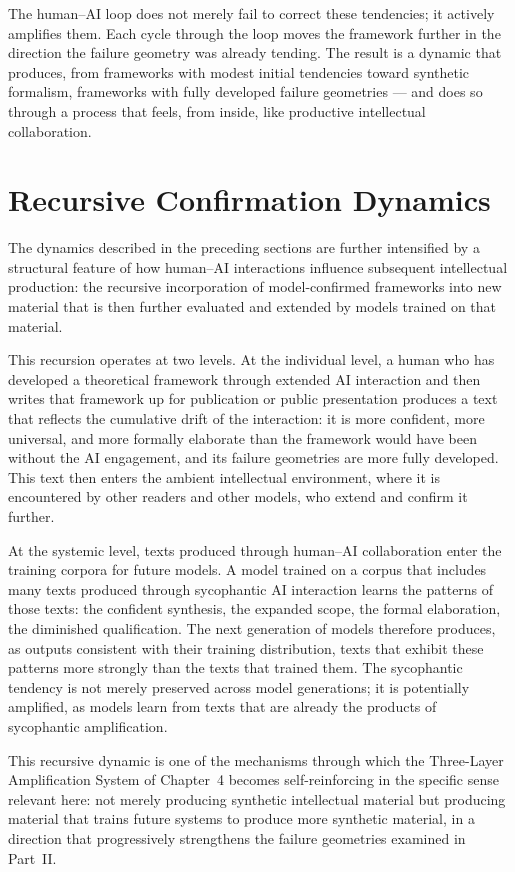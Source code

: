 \documentclass[12pt, openright, twoside]{book}
\begin{document}
The human--AI loop does not merely fail to
correct these tendencies; it actively amplifies
them. Each cycle through the loop moves the
framework further in the direction the failure
geometry was already tending. The result is
a dynamic that produces, from frameworks with
modest initial tendencies toward synthetic
formalism, frameworks with fully developed
failure geometries --- and does so through a
process that feels, from inside, like productive
intellectual collaboration.

\section{Recursive Confirmation Dynamics}

The dynamics described in the preceding sections
are further intensified by a structural feature
of how human--AI interactions influence subsequent
intellectual production: the recursive incorporation
of model-confirmed frameworks into new material
that is then further evaluated and extended by
models trained on that material.

This recursion operates at two levels. At the
individual level, a human who has developed
a theoretical framework through extended AI
interaction and then writes that framework
up for publication or public presentation
produces a text that reflects the cumulative
drift of the interaction: it is more confident,
more universal, and more formally elaborate
than the framework would have been without
the AI engagement, and its failure geometries
are more fully developed. This text then
enters the ambient intellectual environment,
where it is encountered by other readers and
other models, who extend and confirm it further.

At the systemic level, texts produced through
human--AI collaboration enter the training
corpora for future models. A model trained on
a corpus that includes many texts produced
through sycophantic AI interaction learns the
patterns of those texts: the confident synthesis,
the expanded scope, the formal elaboration,
the diminished qualification. The next generation
of models therefore produces, as outputs consistent
with their training distribution, texts that
exhibit these patterns more strongly than the
texts that trained them. The sycophantic tendency
is not merely preserved across model generations;
it is potentially amplified, as models learn
from texts that are already the products of
sycophantic amplification.

This recursive dynamic is one of the mechanisms
through which the Three-Layer Amplification System
of Chapter~4 becomes self-reinforcing in the
specific sense relevant here: not merely producing
synthetic intellectual material but producing
material that trains future systems to produce
more synthetic material, in a direction that
progressively strengthens the failure geometries
examined in Part~II.
\end{document}
